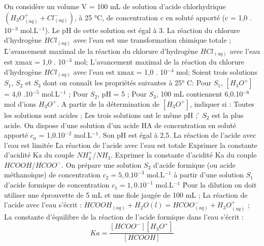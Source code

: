 \q	
   On considère un volume V = 100 mL de solution d'acide chlorhydrique $(H_3O^+_{(aq)} + Cl^-_{(aq)})$, à 25 °C, de concentration c en soluté apporté (c = 1,0 . 10$^{-3}$ mol.L$^{-1}$). Le pH de cette solution est égal à 3. 
\rv
  La réaction du chlorure d'hydrogène $HCl_{(aq)}$ avec l'eau est une transformation chimique totale ;
\r
  L'avancement maximal de la réaction du chlorure d'hydrogène $HCl_{(aq)}$ avec l'eau est xmax = 1,0 . 10$^{-3}$ mol;
  \rv
  L'avancement maximal de la réaction du chlorure d'hydrogène $HCl_{(aq)}$ avec l'eau est xmax = 1,0 . 10$^{-4}$ mol;
 \q	
Soient trois solutions $S_1$, $S_2$ et $S_3$ dont on connaît les propriétés suivantes à 25° C:
Pour $S_1$, $[H_3O^+]$ = 4,0 .10$^{-5}$ mol.L$^{-1}$ ;
Pour $S_2$, pH = 5 ;
Pour $S_3$, 100 mL contiennent 6,0.10$^{-6}$ mol d'ions $H_3O^+$.
A partir de la détermination de $[H_3O^+]$, indiquer si :
\rv
Toutes les solutions sont acides ;
\r
Les trois solutions ont le même pH ;
\r
$S_2$ est la plus acide.
\q	
On dispose d'une solution d'un acide HA de concentration en soluté apporté $c_a$ = 1,0.10$^{-2}$  mol.L$^{-1}$. Son pH est égal à  2,5.
\rv
La réaction de l'acide avec l'eau est limitée 
\r
La réaction de l'acide avec l'eau est totale
\q	
Exprimer la constante d'acidité Ka du couple $NH_4^+/ NH_3$.
\q	Exprimer la constante d'acidité Ka du couple $HCOOH/HCOO^{-}$.
   \q	
On prépare une solution $S_2$ d'acide formique (ou acide méthanoïque) de concentration        $c_2 = 5,0 . 10^{-3}$ mol.L$^{-1}$ à partir d'une solution $S_1$ d'acide formique de concentration $c_1 =1,0 . 10^{-1}$ mol.L$^{-1}$ 
\r
Pour la dilution on doit utiliser une éprouvette de 5 mL et une fiole jaugée de 100 mL ;
\rv 
La réaction de l'acide avec l'eau s'écrit :
$HCOOH_{(aq)}+H_2O(l) = HCOO^{-} _{(aq)}+ H_3O^+ _{(aq)}$ ;
\rv
La constante d'équilibre de la réaction de l'acide formique dans l'eau s'écrit :
$$Ka=\dfrac{[HCOO^{-}][H_3O^{+}]}{[HCOOH]}$$
